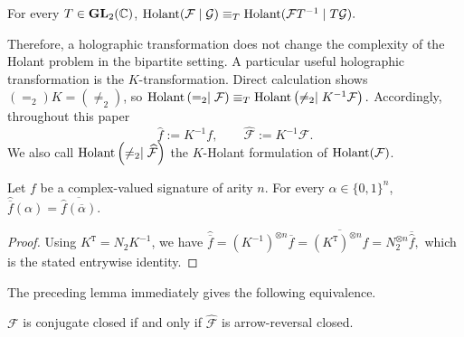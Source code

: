 \begin{theorem}\label{thm: holographic transformation}
 For every $T \in {\bf GL}_2({\mathbb{C}})$,
  $\operatorname{Holant}(\mathcal{F} \mid \mathcal{G}) \equiv_T \operatorname{Holant}(\mathcal{F} T^{-1} \mid T \mathcal{G}).$
\end{theorem}

Therefore,
a holographic transformation does not change the complexity of the Holant problem in the bipartite setting. 
A particular useful holographic transformation is the $K$-transformation.
Direct calculation shows $(=_2)K=(\neq_2)$, so
\(
\operatorname{Holant}\left(=_2\mid \mathcal F\right)
\equiv_T
\operatorname{Holant}\left(\neq_2\mid K^{-1}\mathcal F\right).
\)
Accordingly, throughout this paper
\[
\widehat f:=K^{-1}f,
\qquad
\widehat{\mathcal F}:=K^{-1}\mathcal F.
\]
We also call
$\operatorname{Holant}\left(\neq_2\mid \widehat{\mathcal F}\right)$ the
{$K$-Holant} formulation of $\operatorname{Holant}(\mathcal F)$.


\begin{lemma}\label{lm: conjugation and K-trans}
Let $f$ be a complex-valued signature of arity $n$.  For every
$\alpha\in\{0,1\}^n$,
\(
\widehat{\overline f}(\alpha)
=\overline{\widehat f(\overline\alpha)}.
\)
\end{lemma}
\begin{proof}
Using $K^{\mathtt T}=N_2K^{-1}$, we have
\(
\widehat{\overline f}
=(K^{-1})^{\otimes n}\overline f
=\overline{(K^{\mathtt T})^{\otimes n}f}
=N_2^{\otimes n}\overline{\widehat f},
\)
which is the stated entrywise identity.
\end{proof}

The preceding lemma immediately gives
the following equivalence.
\begin{lemma}\label{lm: conjugate closed and ars closed}
$\mathcal F$ is conjugate closed if and only if
$\widehat{\mathcal F}$ is arrow-reversal closed.
\end{lemma}

